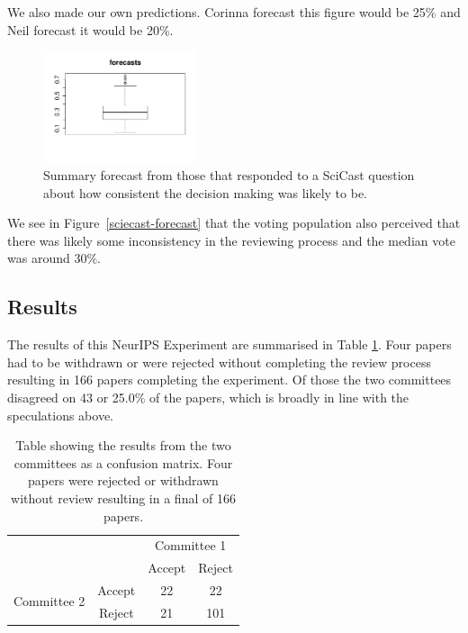 \documentclass[twoside]{article}
\begin{document}
We also made our own predictions.  Corinna forecast this figure would be
25\% and Neil forecast it would be 20\%. 

\begin{figure}[htb]
\begin{center}
\includegraphics[width=0.40\textwidth]{diagrams/neurips/scicast-forecast.png}
\end{center}
\caption{Summary forecast from those that responded to a SciCast question about how consistent the decision making was likely to be.}
\label{scicast-forecast}
\end{figure}

We see in Figure~\ref{sciecast-forecast} that the voting population also perceived that there was likely some inconsistency in the 
reviewing process and the median vote was around 30\%.

\subsection{Results}

The results of this NeurIPS Experiment are summarised in Table
\ref{table-neurips-experiment-results}. Four papers had to
be withdrawn or were rejected without completing the review process
resulting in 166 papers completing the experiment. Of those the two committees disagreed
on 43 or 25.0\% of the papers, which is broadly in line with the speculations above.

\begin{table}[htb]
\caption{Table showing the results from the two committees as a
  confusion matrix. Four papers were rejected or withdrawn without
  review resulting in a final of 166 papers.}
\label{table-neurips-experiment-results}
\centering
\begin{tabular}{lc|c|c|}
& & \multicolumn{2}{c}{Committee 1} \\
& & Accept & Reject \\ \hline
\multirow{2}{*}{Committee 2} & Accept & 22 & 22 \\
& Reject & 21 & 101 
\end{tabular}
\end{table}
\end{document}
